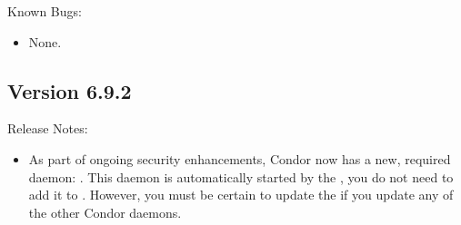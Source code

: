 \noindent Known Bugs:

\begin{itemize}

\item None.

\end{itemize}

\subsection*{\label{sec:New-6-9-2}Version 6.9.2}

\noindent Release Notes:

\begin{itemize}

\item As part of ongoing security enhancements, Condor now has a
new, required daemon: .  This daemon is
automatically started by the , you do not need to
add it to .  
However, you must be certain to update the 
if you update any of the other Condor daemons.


\end{itemize}
